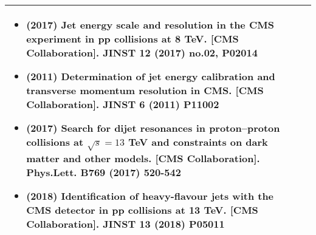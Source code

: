 \begin{center}
\begin{tabular}{|p{}|p{}|}
{\begin{itemize}
\item (2017) Jet energy scale and resolution in the CMS experiment in pp collisions at 8 TeV. [CMS Collaboration]. JINST 12 (2017) no.02, P02014
\item (2011) Determination of jet energy calibration and transverse momentum resolution in CMS. [CMS Collaboration]. JINST 6 (2011) P11002
\item (2017) Search for dijet resonances in proton–proton collisions at $\sqrt{s}=13$ TeV and constraints on dark matter and other models. [CMS Collaboration]. Phys.Lett. B769 (2017) 520-542
\item (2018) Identification of heavy-flavour jets with the CMS detector in pp collisions at 13 TeV. [CMS Collaboration].   	JINST 13 (2018) P05011
\vspace{-2mm}
\end{itemize}
}\tabularnewline\hline
\end{tabular}
\end{center}
